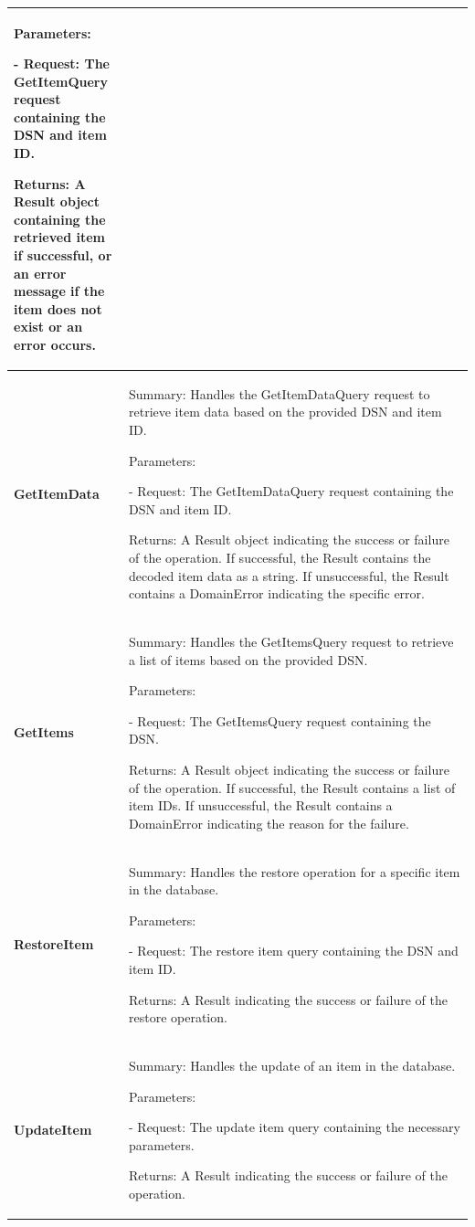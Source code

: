 \begin{longtable}
\begin{tabular}{|p{0.25\linewidth}|p{0.75\linewidth}|}
Parameters:

- Request: The GetItemQuery request containing the DSN and item ID.

Returns: A Result object containing the retrieved item if successful, or an error message if the item does not exist or an error occurs.
\\
\hline
    \textbf{GetItemData} & Summary: Handles the GetItemDataQuery request to retrieve item data based on the provided DSN and item ID.
    
Parameters:

- Request: The GetItemDataQuery request containing the DSN and item ID.

Returns: A Result object indicating the success or failure of the operation. If successful, the Result contains the decoded item data as a string. If unsuccessful, the Result contains a DomainError indicating the specific error.
\\
\hline
    \textbf{GetItems} & Summary: Handles the GetItemsQuery request to retrieve a list of items based on the provided DSN.
    
Parameters:

- Request: The GetItemsQuery request containing the DSN.

Returns: A Result object indicating the success or failure of the operation. If successful, the Result contains a list of item IDs. If unsuccessful, the Result contains a DomainError indicating the reason for the failure.
\\
\hline
    \textbf{RestoreItem} & Summary: Handles the restore operation for a specific item in the database.
    
Parameters:

- Request: The restore item query containing the DSN and item ID.

Returns: A Result indicating the success or failure of the restore operation.
\\
\hline
    \textbf{UpdateItem} & Summary: Handles the update of an item in the database.

Parameters:

- Request: The update item query containing the necessary parameters.

Returns: A Result indicating the success or failure of the operation.
\\
        \hline
    \end{tabular}
\end{longtable}
       
